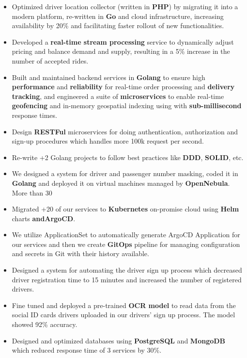 \vspace{0.5cm}

\begin{itemize}
      \item Optimized driver location collector (written in \textbf{PHP}) by migrating it into a modern platform, re-written in \textbf{Go} and cloud infrastructure,
            increasing availability by 20\% and facilitating faster rollout of new functionalities.
      \item Developed a \textbf{real-time stream processing} service to dynamically adjust pricing and balance demand and supply,
            resulting in a 5\% increase in the number of accepted rides.
      \item Built and maintained backend services in \textbf{Golang} to ensure
            high \textbf{performance} and \textbf{reliability} for real-time order processing and \textbf{delivery tracking},
            and engineered a suite of \textbf{microservices} to enable real-time \textbf{geofencing} and in-memory geospatial
            indexing using  with \textbf{sub-millisecond} response times.
      \item Design \textbf{RESTFul} microservices for doing authentication, authorization and sign-up procedures which handles more 100k request per second.
      \item Re-write +2 Golang projects to follow best practices like \textbf{DDD}, \textbf{SOLID}, etc.
      \item We designed a system for driver and passenger number masking, coded it in \textbf{Golang}
            and deployed it on virtual machines managed by \textbf{OpenNebula}. More than 30%
      \item Migrated +20 of our services to \textbf{Kubernetes} on-promise cloud using \textbf{Helm} charts \textbf{andArgoCD}.
      \item We utilize  ApplicationSet to automatically generate ArgoCD Application
            for our services and then we create \textbf{GitOps} pipeline for managing configuration
            and secrets in Git with their history available.
      \item Designed a system for automating the driver sign up process which decreased driver registration time to 15 minutes and increased the number of registered drivers.
      \item Fine tuned and deployed a pre-trained \textbf{OCR model} to read data from the social ID cards drivers uploaded in our drivers' sign up process. The model showed 92\% accuracy.
      \item Designed and optimized databases using \textbf{PostgreSQL} and \textbf{MongoDB} which reduced response time of 3 services by 30\%.
\end{itemize}


